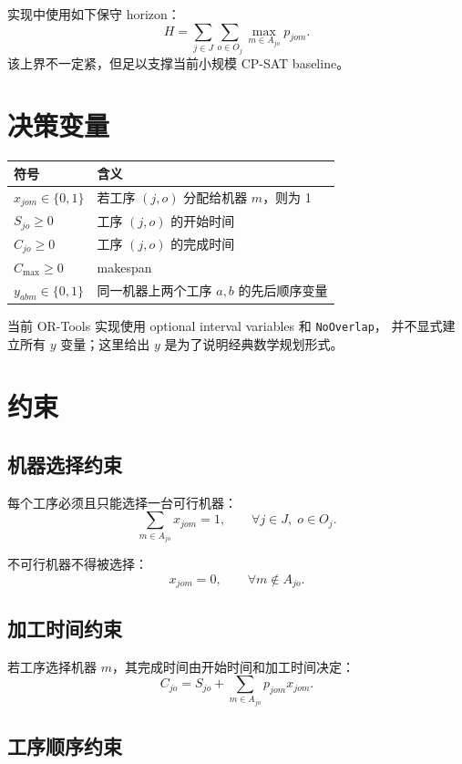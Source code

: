 ﻿\documentclass[11pt]{ctexart}
\begin{document}
实现中使用如下保守 horizon：
\[
H = \sum_{j \in J} \sum_{o \in O_j} \max_{m \in A_{jo}} p_{jom}.
\]
该上界不一定紧，但足以支撑当前小规模 CP-SAT baseline。

\section{决策变量}

\begin{table}[h]
\centering
\begin{tabular}{ll}
\toprule
符号 & 含义 \\
\midrule
$x_{jom} \in \{0,1\}$ & 若工序 $(j,o)$ 分配给机器 $m$，则为 1 \\
$S_{jo} \ge 0$ & 工序 $(j,o)$ 的开始时间 \\
$C_{jo} \ge 0$ & 工序 $(j,o)$ 的完成时间 \\
$C_{\max} \ge 0$ & makespan \\
$y_{abm} \in \{0,1\}$ & 同一机器上两个工序 $a,b$ 的先后顺序变量 \\
\bottomrule
\end{tabular}
\end{table}

当前 OR-Tools 实现使用 optional interval variables 和 \texttt{NoOverlap}，
并不显式建立所有 $y$ 变量；这里给出 $y$ 是为了说明经典数学规划形式。

\section{约束}

\subsection{机器选择约束}

每个工序必须且只能选择一台可行机器：
\[
\sum_{m \in A_{jo}} x_{jom} = 1,
\qquad \forall j \in J,\; o \in O_j.
\]

不可行机器不得被选择：
\[
x_{jom}=0,
\qquad \forall m \notin A_{jo}.
\]

\subsection{加工时间约束}

若工序选择机器 $m$，其完成时间由开始时间和加工时间决定：
\[
C_{jo} = S_{jo} + \sum_{m \in A_{jo}} p_{jom}x_{jom}.
\]

\subsection{工序顺序约束}
\end{document}
